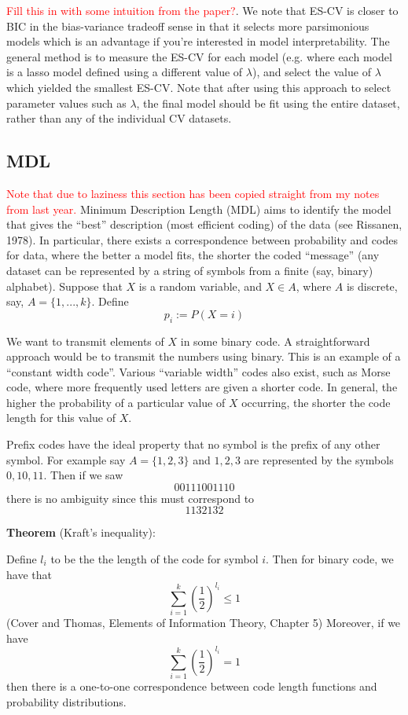 \textcolor{red}{Fill this in with some intuition from the paper?}. We note that ES-CV is closer to BIC in the bias-variance tradeoff sense in that it selects more parsimonious models which is an advantage if you're interested in model interpretability. The general method is to measure the ES-CV for each model (e.g. where each model is a lasso model defined using a different value of $\lambda$), and select the value of $\lambda$ which yielded the smallest ES-CV. Note that after using this approach to select parameter values such as $\lambda$, the final model should be fit using the entire dataset, rather than any of the individual CV datasets.



\subsection*{MDL}
\textcolor{red}{Note that due to laziness this section has been copied straight from my notes from last year.}
Minimum Description Length (MDL) aims to identify the model that gives the ``best'' description (most efficient coding) of the data (see Rissanen, 1978). In particular, there exists a correspondence between probability and codes for data, where the better a model fits, the shorter the coded ``message'' (any dataset can be represented by a string of symbols from a finite (say, binary) alphabet). Suppose that $X$ is a random variable, and $X \in A$, where $A$ is discrete, say, $A = \{1, ..., k\}$. Define
$$p_i := P(X = i)$$

We want to transmit elements of $X$ in some binary code. A straightforward approach would be to transmit the numbers using binary. This is an example of a ``constant width code''. Various ``variable width'' codes also exist, such as Morse code, where more frequently used letters are given a shorter code. In general, the higher the probability of a particular value of $X$ occurring, the shorter the code length for this value of $X$.

Prefix codes have the ideal property that no symbol is the prefix of any other symbol. For example say $A = \{1,2,3\}$ and $1, 2, 3$ are represented by the symbols $0, 10, 11$. Then if we saw
$$0 0 1 1 1 0 0 1 1 1 0 $$
there is no ambiguity since this must correspond to 
$$ 1 1 3 2 1 3 2$$


{\bf Theorem} (Kraft's inequality):

Define $l_i$ to be the the length of the code for symbol $i$. Then for binary code, we have that
$$\sum_{i=1}^k \left(\frac12\right)^{l_i} \leq 1$$
(Cover and Thomas, Elements of Information Theory, Chapter 5) Moreover, if we have
$$\sum_{i=1}^k \left(\frac12\right)^{l_i} = 1$$
then there is a one-to-one correspondence between code length functions and probability distributions.

